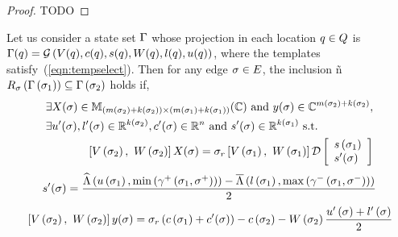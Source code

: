 \begin{proof}
{\color{red} TODO}
\end{proof}

\begin{lemma}
  Let us consider a state set $\Gamma$ whose projection in each
  location $q\in Q$ is $\Gamma(q)
  = \mathcal{G}\left(V(q),c(q),s(q),W(q),l(q),u(q)\right)$, where
  the templates satisfy~(\ref{eqn:tempselect}).  Then for any
  edge $\sigma\in E$, the inclusion
  ñ$R_{\sigma}\left(\Gamma\left(\sigma_{1}\right)\right) \subseteq \Gamma\left(\sigma_{2}\right)$
  holds if,
\begin{align}
\begin{split}
& \exists X(\sigma)\in
\mathbb{M}_{\left(m\left(\sigma_{2}\right)+k\left(\sigma_{2}\right)\right)\times \left(m\left(\sigma_{1}\right)+k\left(\sigma_{1}\right)\right)}(\mathbb{\mathbb{C}})~\text{and}~y(\sigma)\in
\mathbb{C}^{m\left(\sigma_{2}\right)+k\left(\sigma_{2}\right)},\\
& \exists u^\prime(\sigma),l^\prime(\sigma)\in \mathbb{R}^{k\left(\sigma_{2}\right)}, c^\prime(\sigma)\in\mathbb{R}^n~\text{and}~s^\prime(\sigma)\in\mathbb{R}^{k\left(\sigma_{1}\right)}~\text{s.t.}
\end{split}\\
\begin{split}
& \left[V\left(\sigma_{2}\right),~W\left(\sigma_{2}\right)\right]X(\sigma) = \sigma_r\left[V\left(\sigma_{1}\right),~W\left(\sigma_{1}\right)\right]\mathcal{D}
\left[\begin{array}{l}{s\left(\sigma_{1}\right)}\\{s^\prime(\sigma)} \end{array}\right]\\
\end{split}
\end{align}
\begin{align}
\begin{split}
s^\prime(\sigma) = \frac{\widehat{\Lambda}\left(u\left(\sigma_{1}\right),\min\left(\gamma^+\left(\sigma_{1},\sigma^+\right)\right)\right)-
\overline{\Lambda}\left(l\left(\sigma_{1}\right),\max\left(\gamma^-\left(\sigma_{1},\sigma^-\right)\right)\right)}{2}\\
\end{split}
\end{align}
\begin{align}
\begin{split}
& \left[V\left(\sigma_{2}\right),~W\left(\sigma_{2}\right)\right]y(\sigma) = \sigma_r\left(c\left(\sigma_{1}\right)+c^\prime(\sigma)\right)- 
c\left(\sigma_{2}\right) - W\left(\sigma_{2}\right)\frac{u^\prime\left(\sigma\right)+l^\prime\left(\sigma\right)}{2}\\
\end{split}
\end{align}

\end{lemma}
